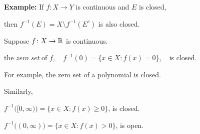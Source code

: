\documentclass[10pt,aspectratio=149]{beamer}
\begin{document}
\begin{frame}

\textbf{Example:}
If $f \colon X \to Y$ is continuous and $E$ is closed,

\pause
then $f^{-1}(E) = X \setminus f^{-1}(E^c)$ is also closed.

\pause
\medskip

Suppose 
$f \colon X \to {\mathbb{R}}$ is continuous.

\pause
\medskip

\thus \quad
the 
\emph{zero set} of $f$, ~
$f^{-1}(0) = \bigl\{ x \in X : f(x) = 0 \bigr\}$, ~
is closed.

\pause
\medskip

For example, the zero set of a polynomial is closed.

\pause
\medskip

Similarly, 

\medskip

$f^{-1}\bigl( [0,\infty) \bigr) = \bigl\{ x \in X : f(x) \geq 0 \bigr\}$,
is closed.

\pause
\medskip

$f^{-1}\bigl( (0,\infty) \bigr) = \bigl\{ x \in X : f(x) > 0 \bigr\}$,
is open.  

\end{frame}
\end{document}

